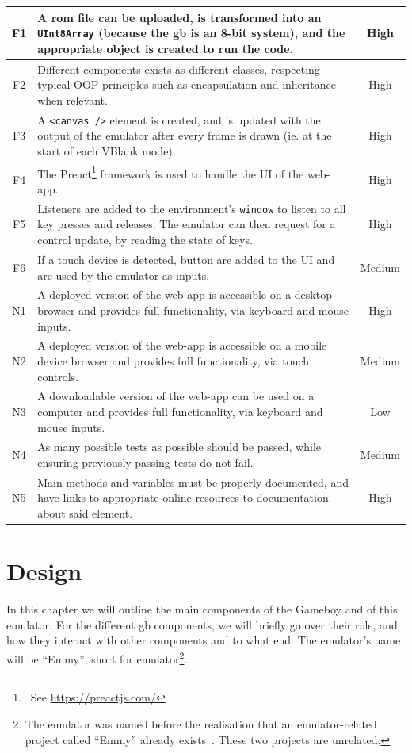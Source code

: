 \documentclass[11pt]{informatics-report}
\newcommand{\ftnt}[1]{\footnote{~See \url{#1}}}
\begin{document}
\begin{xltabular}{\textwidth}{|c|X|c|}
    F1 & A \gls{rom} file can be uploaded, is transformed into an \texttt{UInt8Array} (because the \gls{gb} is an 8-bit system), and the appropriate object is created to run the code. & High \\ \hline
    F2 & Different components exists as different classes, respecting typical OOP principles such as encapsulation and inheritance when relevant. & High \\ \hline
    F3 & A \texttt{<canvas />} element is created, and is updated with the output of the emulator after every frame is drawn (ie. at the start of each VBlank mode). & High \\ \hline
    F4 & The Preact\ftnt{https://preactjs.com/} framework is used to handle the UI of the web-app. & High \\ \hline
    F5 & Listeners are added to the environment's \texttt{window} to listen to all key presses and releases. The emulator can then request for a control update, by reading the state of keys. & High \\ \hline
    F6 & If a touch device is detected, button are added to the UI and are used by the emulator as inputs. & Medium \\ \hline

    N1 & A deployed version of the web-app is accessible on a desktop browser and provides full functionality, via keyboard and mouse inputs. & High \\ \hline
    N2 & A deployed version of the web-app is accessible on a mobile device browser and provides full functionality, via touch controls. & Medium \\ \hline
    N3 & A downloadable version of the web-app can be used on a computer and provides full functionality, via keyboard and mouse inputs. & Low \\ \hline
    N4 & As many possible tests as possible should be passed, while ensuring previously passing tests do not fail. & Medium \\ \hline
    N5 & Main methods and variables must be properly documented, and have links to appropriate online resources to documentation about said element. & High \\ \hline
\end{xltabular}

\chapter{Design}

In this chapter we will outline the main components of the Gameboy and of this emulator. For the different \gls{gb} components, we will briefly go over their role, and how they interact with other components and to what end. The emulator's name will be ``Emmy'', short for emulator\footnote{The emulator was named before the realisation that an emulator-related project called ``Emmy'' already exists~\cite{emmy_stanford}. These two projects are unrelated.}.
\end{document}
